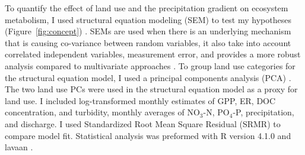 To quantify the effect of land use and the precipitation gradient on ecosystem metabolism, I used structural equation modeling (SEM) to test my hypotheses (Figure~\ref{fig:concept}) \cite{bernot_inter-regional_2010, fus_land_2017}. SEMs are used when there is an underlying mechanism that is causing co-variance between random variables, it also take into account correlated independent variables, measurement error, and provides a more robust analysis compared to multivariate approaches \cite{malaeb_using_2000, bernot_inter-regional_2010}. To group land use categories for the structural equation model, I used a principal components analysis (PCA) \cite{rcore}. The two land use PCs were used in the structural equation model as a proxy for land use. I included log-transformed monthly estimates of GPP, ER, DOC concentration, and turbidity, monthly averages of NO$_3$-N, PO$_4$-P, precipitation, and discharge. I used Standardized Root Mean Square Residual (SRMR) to compare model fit. Statistical analysis was preformed with R version 4.1.0 and lavaan \cite{rcore, rosseel_lavaan}.

\endinput

